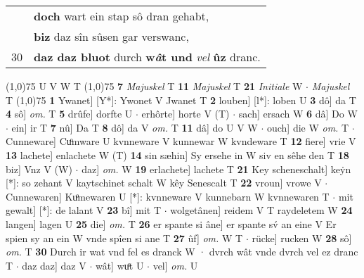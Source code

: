 \documentclass[8pt,a4paper,notitlepage]{article}
\begin{document}
\begin{table}[ht]
\begin{minipage}[t]{0.5\linewidth}
\begin{tabular}{rl}
 & \textbf{doch} wart ein stap sô dran gehabt,\\ 
 & \textbf{biz} daz sîn sûsen gar verswanc,\\ 
30 & \textbf{daz daz bluot} durch \textbf{w\textit{â}t und} \textit{vel} \textbf{ûz} dranc.\\ 
\end{tabular}
\scriptsize
\line(1,0){75} \newline
U V W T \newline
\line(1,0){75} \newline
\textbf{7} \textit{Majuskel} T  \textbf{11} \textit{Majuskel} T  \textbf{21} \textit{Initiale} W   $\cdot$ \textit{Majuskel} T  \newline
\line(1,0){75} \newline
\textbf{1} Ywanet] [Y*]: Ywonet V Jwanet T \textbf{2} louben] [l*]: loben U \textbf{3} dô] da T \textbf{4} sô] \textit{om.} T \textbf{5} drûfe] dorfte U  $\cdot$ erhôrte] horte V (T)  $\cdot$ sach] ersach W \textbf{6} dâ] Do W  $\cdot$ ein] ir T \textbf{7} nû] Da T \textbf{8} dô] da V \textit{om.} T \textbf{11} dâ] do U V W  $\cdot$ ouch] die W \textit{om.} T  $\cdot$ Cunneware] Cuͦmware U kvnneware V kunnewar W kvndeware T \textbf{12} fiere] vrie V \textbf{13} lachete] enlachete W (T) \textbf{14} sin sæhin] Sy ersehe in W siv en sêhe den T \textbf{18} biz] Vnz V (W)  $\cdot$ daz] \textit{om.} W \textbf{19} erlachete] lachete T \textbf{21} Key scheneschalt] keẏn [*]: so zehant V kaytschinet schalt W kêy Senescalt T \textbf{22} vroun] vrowe V  $\cdot$ Cunnewaren] Kuͦmewaren U [*]: kvnneware V kunnebarn W kvnnewaren T  $\cdot$ mit gewalt] [*]: de lalant V \textbf{23} bî] mit T  $\cdot$ wolgetânen] reidem V T raydeletem W \textbf{24} langen] lagen U \textbf{25} die] \textit{om.} T \textbf{26} er spante si âne] er spante sv́ an eine V Er spien sy an ein W vnde spîen si ane T \textbf{27} ûf] \textit{om.} W T  $\cdot$ rücke] rucken W \textbf{28} sô] \textit{om.} T \textbf{30} Durch ir wat vnd fel es dranck W · dvrch wât vnde dvrch vel ez dranc T  $\cdot$ daz daz] daz V  $\cdot$ wât] wuͦt U  $\cdot$ vel] \textit{om.} U \newline
\end{minipage}
\end{table}
\end{document}
